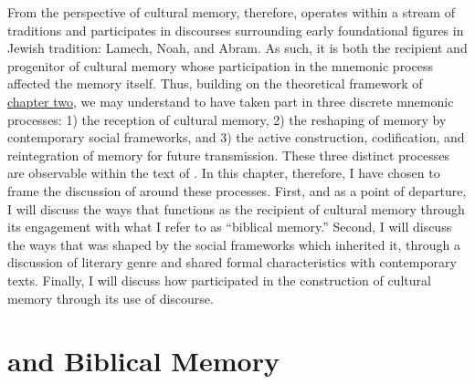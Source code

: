 From the perspective of cultural memory, therefore, \ga operates within a stream of traditions and participates in discourses surrounding early foundational figures in Jewish tradition: Lamech, Noah, and Abram. As such, it is both the recipient and progenitor of cultural memory whose participation in the mnemonic process affected the memory itself. Thus, building on the theoretical framework of \hyperref[chap:memory]{chapter two}, we may understand \ga to have taken part in three discrete mnemonic processes: 1) the reception of cultural memory, 2) the reshaping of memory by contemporary social frameworks, and 3) the active construction, codification, and reintegration of memory for future transmission. These three distinct processes are observable within the text of \ga. In this chapter, therefore, I have chosen to frame the discussion of \ga around these processes. First, and as a point of departure, I will discuss the ways that \ga functions as the recipient of cultural memory through its engagement with what I refer to as  ``biblical memory.'' Second, I will discuss the ways that \ga was shaped by the social frameworks which inherited it, through a discussion of literary genre and shared formal characteristics with contemporary texts. Finally, I will discuss how \ga participated in the construction of cultural memory through its use of \psgraphical discourse.


\section{\ga and Biblical Memory}

